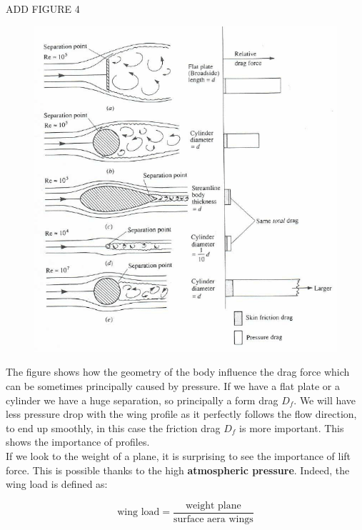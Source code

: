 		\begin{center}
		ADD FIGURE 4
		\end{center}
		
		\begin{figure}
		\vspace{-5mm}
		\includegraphics[scale=0.3]{ch2/2}
		\end{figure}
		The figure shows how the geometry of the body influence the drag force which can be sometimes principally caused by pressure. If we have a flat plate or a cylinder we have a huge separation, so principally a form drag $D_f$. We will have less pressure drop with the wing profile as it perfectly follows the flow direction, to end up smoothly, in this case the friction drag $D_f$ is more important. This shows the importance of profiles. \\
		
		If we look to the weight of a plane, it is surprising to see the importance of lift force. This is possible thanks to the high \textbf{atmospheric pressure}. Indeed, the wing load is defined as: 
		
		\begin{equation}
		\mbox{wing load} = \frac{\mbox{weight plane}}{\mbox{surface aera wings}}
		\end{equation}
				
